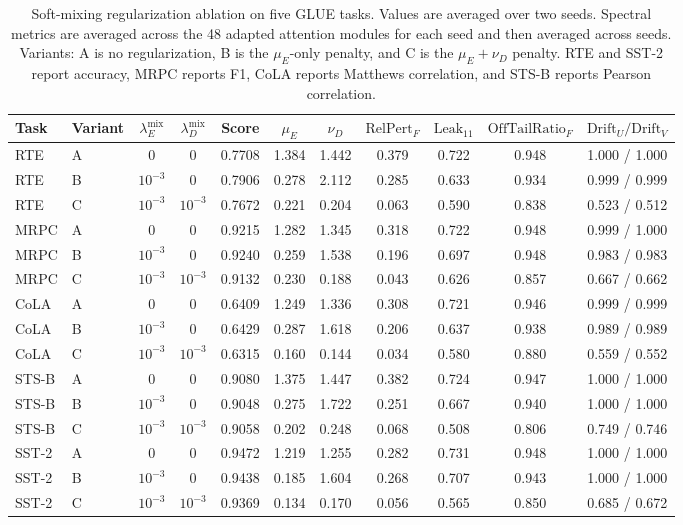 \begin{table}[h]
\centering
\caption{Soft-mixing regularization ablation on five GLUE tasks. Values are
averaged over two seeds. Spectral metrics are averaged across the 48 adapted
attention modules for each seed and then averaged across seeds. Variants: A is
no regularization, B is the \(\mu_E\)-only penalty, and C is the
\(\mu_E+\nu_D\) penalty. RTE and SST-2 report accuracy, MRPC reports F1, CoLA
reports Matthews correlation, and STS-B reports Pearson correlation.}
\label{tab:soft_mixing_ablation}
\begin{adjustbox}{max width=\linewidth}
\begin{tabular}{llccccccccc}
\toprule
\textbf{Task} &
\textbf{Variant} &
\(\lambda_E^{\mathrm{mix}}\) &
\(\lambda_D^{\mathrm{mix}}\) &
\textbf{Score} &
\(\mu_E\) &
\(\nu_D\) &
\(\mathrm{RelPert}_F\) &
\(\mathrm{Leak}_{11}\) &
\(\mathrm{OffTailRatio}_F\) &
\(\mathrm{Drift}_U / \mathrm{Drift}_V\) \\
\midrule
RTE   & A & 0 & 0 & 0.7708 & 1.384 & 1.442 & 0.379 & 0.722 & 0.948 & 1.000 / 1.000 \\
RTE   & B & \(10^{-3}\) & 0 & 0.7906 & 0.278 & 2.112 & 0.285 & 0.633 & 0.934 & 0.999 / 0.999 \\
RTE   & C & \(10^{-3}\) & \(10^{-3}\) & 0.7672 & 0.221 & 0.204 & 0.063 & 0.590 & 0.838 & 0.523 / 0.512 \\
\midrule
MRPC  & A & 0 & 0 & 0.9215 & 1.282 & 1.345 & 0.318 & 0.722 & 0.948 & 0.999 / 1.000 \\
MRPC  & B & \(10^{-3}\) & 0 & 0.9240 & 0.259 & 1.538 & 0.196 & 0.697 & 0.948 & 0.983 / 0.983 \\
MRPC  & C & \(10^{-3}\) & \(10^{-3}\) & 0.9132 & 0.230 & 0.188 & 0.043 & 0.626 & 0.857 & 0.667 / 0.662 \\
\midrule
CoLA  & A & 0 & 0 & 0.6409 & 1.249 & 1.336 & 0.308 & 0.721 & 0.946 & 0.999 / 0.999 \\
CoLA  & B & \(10^{-3}\) & 0 & 0.6429 & 0.287 & 1.618 & 0.206 & 0.637 & 0.938 & 0.989 / 0.989 \\
CoLA  & C & \(10^{-3}\) & \(10^{-3}\) & 0.6315 & 0.160 & 0.144 & 0.034 & 0.580 & 0.880 & 0.559 / 0.552 \\
\midrule
STS-B & A & 0 & 0 & 0.9080 & 1.375 & 1.447 & 0.382 & 0.724 & 0.947 & 1.000 / 1.000 \\
STS-B & B & \(10^{-3}\) & 0 & 0.9048 & 0.275 & 1.722 & 0.251 & 0.667 & 0.940 & 1.000 / 1.000 \\
STS-B & C & \(10^{-3}\) & \(10^{-3}\) & 0.9058 & 0.202 & 0.248 & 0.068 & 0.508 & 0.806 & 0.749 / 0.746 \\
\midrule
SST-2 & A & 0 & 0 & 0.9472 & 1.219 & 1.255 & 0.282 & 0.731 & 0.948 & 1.000 / 1.000 \\
SST-2 & B & \(10^{-3}\) & 0 & 0.9438 & 0.185 & 1.604 & 0.268 & 0.707 & 0.943 & 1.000 / 1.000 \\
SST-2 & C & \(10^{-3}\) & \(10^{-3}\) & 0.9369 & 0.134 & 0.170 & 0.056 & 0.565 & 0.850 & 0.685 / 0.672 \\
\bottomrule
\end{tabular}
\end{adjustbox}
\end{table}

